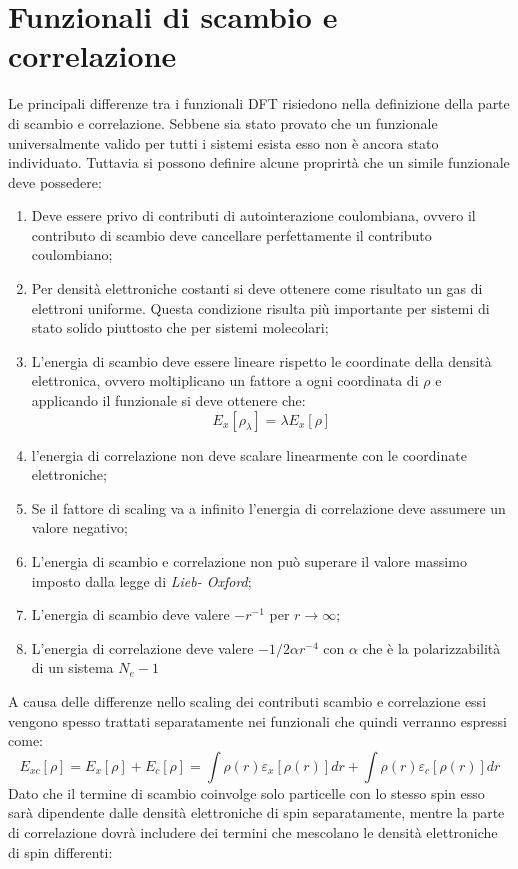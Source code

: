 \documentclass[oneside]{amsbook}
\numberwithin{section}{chapter}
\numberwithin{equation}{section}
\numberwithin{figure}{section}
\begin{document}
\section{Funzionali di scambio e correlazione}
Le principali differenze tra i funzionali DFT risiedono nella definizione della parte di scambio e correlazione. Sebbene sia stato provato che un funzionale universalmente valido per tutti i sistemi esista esso non è ancora stato individuato. Tuttavia si possono definire alcune proprirtà che un simile funzionale deve possedere:
\begin{enumerate}
\item Deve essere privo di contributi di autointerazione coulombiana, ovvero il contributo di scambio deve cancellare perfettamente il contributo coulombiano;
\item Per densità elettroniche costanti si deve ottenere come risultato un gas di elettroni uniforme. Questa condizione risulta più importante per sistemi di stato solido piuttosto che per sistemi molecolari;
\item L'energia di scambio deve essere lineare rispetto le coordinate della densità elettronica, ovvero moltiplicano un fattore a ogni coordinata di $\rho$ e applicando il funzionale si deve ottenere che: $$E_x[\rho_\lambda] = \lambda E_x[\rho] $$
\item l'energia di correlazione non deve scalare linearmente con le coordinate elettroniche;
\item Se il fattore di scaling va a infinito l'energia di correlazione deve assumere un valore negativo;
\item L'energia di scambio e correlazione non può superare il valore massimo imposto dalla legge di \emph{Lieb- Oxford};
\item L'energia di scambio deve valere $-r^{-1} $ per $r\rightarrow\infty$;
\item L'energia di correlazione deve valere $-1/2\alpha r^{-4}$ con $\alpha$ che è la polarizzabilità di un sistema $N_e-1$
\end{enumerate}
A causa delle differenze nello scaling dei contributi scambio e correlazione essi vengono spesso trattati separatamente nei funzionali che quindi verranno espressi come:
\begin{equation}
E_{xc}[\rho]= E_{x}[\rho] + E_{c}[\rho] =\int \rho(r) \varepsilon_x[\rho(r)]dr + \int \rho(r) \varepsilon_c[\rho(r)]dr
\end{equation}
Dato che il termine di scambio coinvolge solo particelle con lo stesso spin esso sarà dipendente dalle densità elettroniche di spin separatamente, mentre la parte di correlazione dovrà includere dei termini che mescolano le densità elettroniche di spin differenti:
\end{document}
